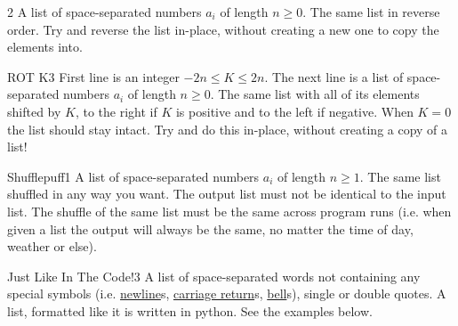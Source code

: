 \begin{task}{}{2}
    \In
    A list of space-separated numbers $a_i$ of length $n \geq 0$.
    \Out
    The same list in reverse order.
    \Note 
    Try and reverse the list in-place, without creating a new one to copy the elements into.
    
    \begin{ExampleIO}
    \end{ExampleIO}
\end{task}

\begin{task}{ROT K}{3}
    \In
    First line is an integer $-2n \leq K \leq 2n$.
    The next line is a list of space-separated numbers $a_i$ of length $n \geq 0$.
    \Out
    The same list with all of its elements shifted by $K$, to the right if $K$ is 
    positive and to the left if negative. When $K = 0$ the list should stay intact.
    \Note 
    Try and do this in-place, without creating a copy of a list!
    
    \begin{ExampleIO}
    \end{ExampleIO}
\end{task}

\begin{task}{Shufflepuff}{1}
    \In
    A list of space-separated numbers $a_i$ of length $n \geq 1$.
    \Out
    The same list shuffled in any way you want. The output list must not be 
    identical to the input list. The shuffle of the same list must be the
    same across program runs (i.e. when given a list the output
    will always be the same, no matter the time of day, weather or else).
    
    \begin{ExampleIO}
    \end{ExampleIO}
\end{task}

\begin{task}{Just Like In The Code!}{3}
    \In
    A list of space-separated words not containing any special symbols 
    (i.e. \href{https://en.wikipedia.org/wiki/Newline}{newline}s, 
    \href{https://en.wikipedia.org/wiki/Carriage_return}{carriage return}s, 
    \href{https://en.wikipedia.org/wiki/Bell_character}{bell}s), single or
    double quotes.
    \Out
    A list, formatted like it is written in python. See the examples below.
    
    \begin{ExampleIO}
    \end{ExampleIO}
\end{task}

